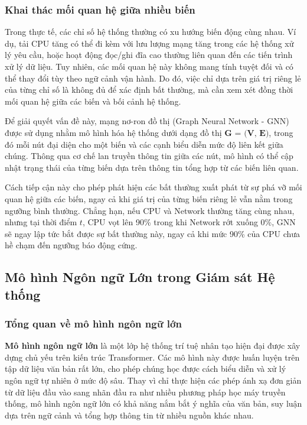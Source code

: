 \subsubsection*{Khai thác mối quan hệ giữa nhiều biến}
Trong thực tế, các chỉ số hệ thống thường có xu hướng biến động cùng nhau. Ví dụ, tải CPU tăng có thể đi kèm với lưu lượng mạng tăng trong các hệ thống xử lý yêu cầu, hoặc hoạt động đọc/ghi đĩa cao thường liên quan đến các tiến trình xử lý dữ liệu. Tuy nhiên, các mối quan hệ này không mang tính tuyệt đối và có thể thay đổi tùy theo ngữ cảnh vận hành. Do đó, việc chỉ dựa trên giá trị riêng lẻ của từng chỉ số là không đủ để xác định bất thường, mà cần xem xét đồng thời mối quan hệ giữa các biến và bối cảnh hệ thống.

Để giải quyết vấn đề này, mạng nơ-ron đồ thị (Graph Neural Network - GNN) được sử dụng nhằm mô hình hóa hệ thống dưới dạng đồ thị $\textbf{G = (V, E)}$, trong đó mỗi nút đại diện cho một biến và các cạnh biểu diễn mức độ liên kết giữa chúng. Thông qua cơ chế lan truyền thông tin giữa các nút, mô hình có thể cập nhật trạng thái của từng biến dựa trên thông tin tổng hợp từ các biến liên quan.

Cách tiếp cận này cho phép phát hiện các bất thường xuất phát từ sự phá vỡ mối quan hệ giữa các biến, ngay cả khi giá trị của từng biến riêng lẻ vẫn nằm trong ngưỡng bình thường. Chẳng hạn, nếu CPU và Network thường tăng cùng nhau, nhưng tại thời điểm $t$, CPU vọt lên 90\% trong khi Network rớt xuống 0\%, GNN sẽ ngay lập tức bắt được sự bất thường này, ngay cả khi mức 90\% của CPU chưa hề chạm đến ngưỡng báo động cứng.

\subsection{Mô hình Ngôn ngữ Lớn trong Giám sát Hệ thống}
\subsubsection{Tổng quan về mô hình ngôn ngữ lớn}
\textbf{Mô hình ngôn ngữ lớn} là một lớp hệ thống trí tuệ nhân tạo hiện đại được xây dựng chủ yếu trên kiến trúc Transformer. Các mô hình này được huấn luyện trên tập dữ liệu văn bản rất lớn, cho phép chúng học được cách biểu diễn và xử lý ngôn ngữ tự nhiên ở mức độ sâu. Thay vì chỉ thực hiện các phép ánh xạ đơn giản từ dữ liệu đầu vào sang nhãn đầu ra như nhiều phương pháp học máy truyền thống, mô hình ngôn ngữ lớn có khả năng nắm bắt ý nghĩa của văn bản, suy luận dựa trên ngữ cảnh và tổng hợp thông tin từ nhiều nguồn khác nhau.

